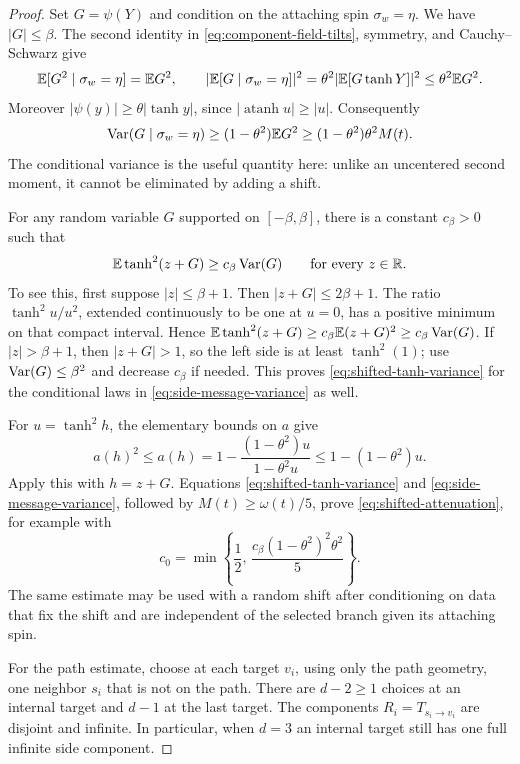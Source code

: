 \begin{proof}
Set \(G=\psi(Y)\) and condition on the attaching spin
\(\sigma_w=\eta\).  We have \(|G|\le\beta\).  The second identity
in \eqref{eq:component-field-tilts}, symmetry, and Cauchy--Schwarz give
\[
 \mathbb E[G^2\mid\sigma_w=\eta]=\mathbb E G^2,\qquad
 |\mathbb E[G\mid\sigma_w=\eta]|^2
   =\theta^2|\mathbb E[G\tanh Y]|^2
   \le\theta^2\mathbb E G^2.
\]
Moreover \(|\psi(y)|\ge\theta|\tanh y|\), since
\(|\operatorname{atanh}u|\ge|u|\).  Consequently
\begin{equation}
\label{eq:side-message-variance}
 \operatorname{Var}(G\mid\sigma_w=\eta)
   \ge(1-\theta^2)\mathbb E G^2
   \ge(1-\theta^2)\theta^2M(t).
\end{equation}
The conditional variance is the useful quantity here: unlike an
uncentered second moment, it cannot be eliminated by adding a shift.

For any random variable \(G\) supported on \([-\beta,\beta]\), there
is a constant \(c_\beta>0\) such that
\begin{equation}
\label{eq:shifted-tanh-variance}
 \mathbb E\tanh^2(z+G)\ge c_\beta\operatorname{Var}(G)
 \qquad\text{for every }z\in\mathbb R.
\end{equation}
To see this, first suppose \(|z|\le\beta+1\).  Then
\(|z+G|\le2\beta+1\).  The ratio \(\tanh^2 u/u^2\), extended
continuously to be one at \(u=0\), has a positive minimum on that
compact interval.  Hence
\(\mathbb E\tanh^2(z+G)\ge c_\beta\mathbb E(z+G)^2\ge c_\beta\operatorname{Var}(G)\).
If \(|z|>\beta+1\), then \(|z+G|>1\), so the left side is at least
\(\tanh^2(1)\); use \(\operatorname{Var}(G)\le\beta^2\) and decrease
\(c_\beta\) if needed.  This proves \eqref{eq:shifted-tanh-variance}
for the conditional laws in \eqref{eq:side-message-variance} as well.

For \(u=\tanh^2h\), the elementary bounds on \(a\) give
\[
 a(h)^2\le a(h)
   =1-\frac{(1-\theta^2)u}{1-\theta^2u}
   \le1-(1-\theta^2)u.
\]
Apply this with \(h=z+G\).  Equations
\eqref{eq:shifted-tanh-variance} and \eqref{eq:side-message-variance},
followed by \(M(t)\ge\omega(t)/5\), prove
\eqref{eq:shifted-attenuation}, for example with
\[
 c_0=\min\left\{\frac12,\,
       \frac{c_\beta(1-\theta^2)^2\theta^2}{5}\right\}.
\]
The same estimate may be used with a random shift after conditioning
on data that fix the shift and are independent of the selected branch
given its attaching spin.

For the path estimate, choose at each target \(v_i\), using only the
path geometry, one neighbor \(s_i\) that is not on the path.  There are
\(d-2\ge1\) choices at an internal target and \(d-1\) at the last
target.  The components \(R_i=T_{s_i\to v_i}\) are disjoint and
infinite.  In particular, when \(d=3\) an internal target still has
one full infinite side component.


\end{proof}
